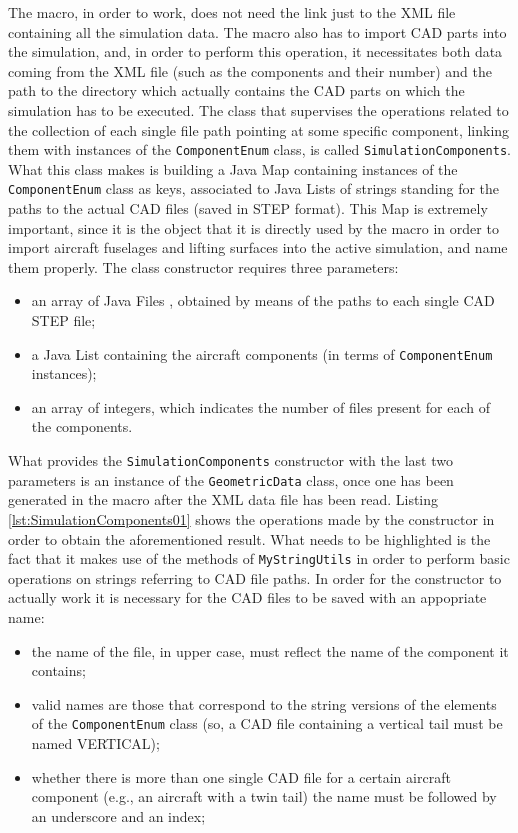 The macro, in order to work, does not need the link just to the XML file containing all the simulation data. The macro also has to import \gls{CAD} parts into the simulation, and, in order to perform this operation, it necessitates both data coming from the XML file (such as the components and their number) and the path to the directory which actually contains the \gls{CAD} parts on which the simulation has to be executed. The class that supervises the operations related to the collection of each single file path pointing at some specific component, linking them with instances of the \lstinline[language=Java]!ComponentEnum! class, is called \lstinline[language=Java]!SimulationComponents!. What this class makes is building a Java \gls{Map} \cite{JavaMap} containing instances of the \lstinline[language=Java]!ComponentEnum! class as keys, associated to Java \gls{List}s of strings standing for the paths to the actual \gls{CAD} files (saved in STEP format). This \gls{Map} is extremely important, since it is the object that it is directly used by the macro in order to import aircraft fuselages and lifting surfaces into the active simulation, and name them properly. The class constructor requires three parameters:
%
\begin{itemize}
\item an array of Java \gls{File}s \cite{JavaFile}, obtained by means of the paths to each single \gls{CAD} STEP file;
\item a Java List containing the aircraft components (in terms of \lstinline[language=Java]!ComponentEnum! instances);
\item an array of integers, which indicates the number of files present for each of the components.
\end{itemize}
%
What provides the \lstinline[language=Java]!SimulationComponents! constructor with the last two parameters is an instance of the \lstinline[language=Java]!GeometricData! class, once one has been generated in the macro after the XML data file has been read. Listing \ref{lst:SimulationComponents01} shows the operations made by the constructor in order to obtain the aforementioned result. What needs to be highlighted is the fact that it makes use of the methods of \lstinline[language=Java]!MyStringUtils! in order to perform basic operations on strings referring to \gls{CAD} file paths. In order for the constructor to actually work it is necessary for the \gls{CAD} files to be saved with an appopriate name: 
%
\begin{itemize}
\item the name of the file, in upper case, must reflect the name of the component it contains;
\item valid names are those that correspond to the string versions of the elements of the \lstinline[language=Java]!ComponentEnum! class (so, a \gls{CAD} file containing a vertical tail must be named VERTICAL); 
\item whether there is more than one single \gls{CAD} file for a certain aircraft component (e.g., an aircraft with a twin tail) the name must be followed by an underscore and an index; 
\end{itemize}
